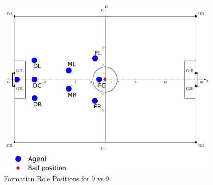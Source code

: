 \begin{figure}[htb!]
\centering
  \includegraphics[width=\textwidth]{Chapter4/figures/Formation9_0.pdf}
  \caption{Formation Role Positions for 9 vs 9.} 
  \label{fig:Formation9_0}
\end{figure}


